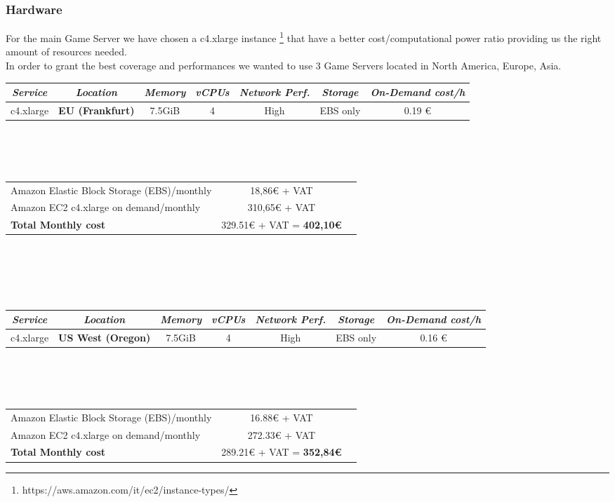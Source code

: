 \subsubsection{Hardware}
\label{section:backend_hardware}
For the main Game Server we have chosen a c4.xlarge instance \footnote{https://aws.amazon.com/it/ec2/instance-types/} that have a better cost/computational power ratio providing us the right amount of resources needed.\\
In order to grant the best coverage and performances we wanted to use 3 Game Servers located in North America, Europe, Asia.
\\
\begin{tabular}{|c|c|c|c|c|c|c|}
\hline
\textit{Service} & \textit{Location} & \textit{Memory} & \textit{vCPUs} & \textit{Network Perf.} & \textit{Storage} & \textit{On-Demand cost/h}\\
\hline
c4.xlarge &	\textbf{EU (Frankfurt)} & 7.5GiB &	4 &	High & EBS only & 0.19 €\\
\hline
\end{tabular}
\\\\\\
\begin{tabular}{lcr}
Amazon Elastic Block Storage (EBS)/monthly  & 18,86€ + VAT \\
Amazon EC2 c4.xlarge on demand/monthly & 310,65€ + VAT \\
\hline
\textbf{Total Monthly cost} & 329.51€ + VAT = \textbf{402,10€}
\end{tabular}
\\
\\\\\\
\begin{tabular}{|c|c|c|c|c|c|c|}
\hline
\textit{Service} & \textit{Location} & \textit{Memory} & \textit{vCPUs} & \textit{Network Perf.} & \textit{Storage} & \textit{On-Demand cost/h}\\
\hline
c4.xlarge &	\textbf{US West (Oregon)} & 7.5GiB &	4 &	High & EBS only & 0.16 €\\
\hline
\end{tabular}
\\\\\\
\begin{tabular}{lcr}
Amazon Elastic Block Storage (EBS)/monthly  & 16.88€ + VAT \\
Amazon EC2 c4.xlarge on demand/monthly & 272.33€ + VAT \\
\hline
\textbf{Total Monthly cost} & 289.21€ + VAT = \textbf{352,84€}
\end{tabular}
